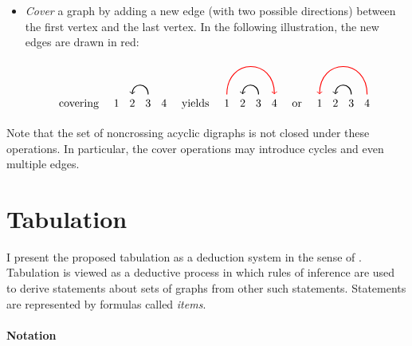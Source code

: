 \documentclass[a4paper]{article}
\begin{document}
\begin{itemize}
\item \emph{Cover} a graph by adding a new edge (with two possible
  directions) between the first vertex and the last vertex.
  In the following illustration, the new edges are drawn in red:
  \begin{displaymath}
    \text{covering}
    \quad
    \begin{tikzpicture}[xscale=0.5, baseline=(n1.base)]
      \node (n1) at (0, 0) {$\mathstrut 1$};
      \node (n2) at (1, 0) {$\mathstrut 2$};
      \node (n3) at (2, 0) {$\mathstrut 3$};
      \node (n4) at (3, 0) {$\mathstrut 4$};
      \path[thick, ->] (n3) edge[out=90, in=90] (n2);
    \end{tikzpicture}
    \quad
    \text{yields}
    \quad
    \begin{tikzpicture}[xscale=0.5, baseline=(n1.base)]
      \node (n1) at (0, 0) {$\mathstrut 1$};
      \node (n2) at (1, 0) {$\mathstrut 2$};
      \node (n3) at (2, 0) {$\mathstrut 3$};
      \node (n4) at (3, 0) {$\mathstrut 4$};
      \path[thick, ->, red] (n1) edge[out=90, in=90] (n4);
      \path[thick, ->] (n3) edge[out=90, in=90] (n2);
    \end{tikzpicture}
    \quad
    \text{or}
    \quad
    \begin{tikzpicture}[xscale=0.5, baseline=(n1.base)]
      \node (n1) at (0, 0) {$\mathstrut 1$};
      \node (n2) at (1, 0) {$\mathstrut 2$};
      \node (n3) at (2, 0) {$\mathstrut 3$};
      \node (n4) at (3, 0) {$\mathstrut 4$};
      \path[thick, <-, red] (n1) edge[out=90, in=90] (n4);
      \path[thick, ->] (n3) edge[out=90, in=90] (n2);
    \end{tikzpicture}
  \end{displaymath}
\end{itemize}
Note that the set of noncrossing acyclic digraphs is not closed under
these operations.
In particular, the cover operations may introduce cycles and even
multiple edges.


\section{Tabulation}

I present the proposed tabulation as a deduction system in the sense
of \citet{shieber1995principles}.
Tabulation is viewed as a deductive process in which rules of
inference are used to derive statements about sets of graphs from
other such statements.
Statements are represented by formulas called \emph{items}.

\paragraph{Notation}
\end{document}
